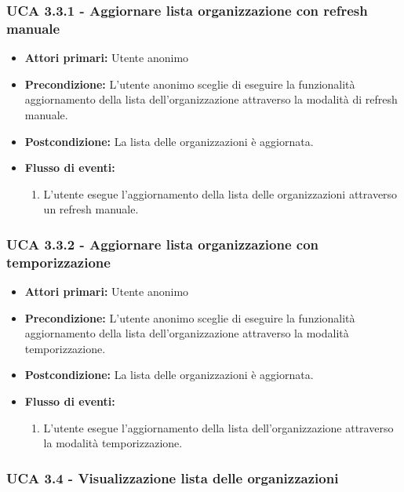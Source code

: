 \subsubsection{UCA 3.3.1 - Aggiornare lista organizzazione con refresh manuale}%
\begin{itemize}
	\item \textbf{Attori primari:} Utente anonimo
	\item \textbf{Precondizione:} L'utente anonimo sceglie di eseguire la funzionalità aggiornamento della lista dell'organizzazione attraverso la modalità di refresh manuale.
	\item \textbf{Postcondizione:} La lista delle organizzazioni è aggiornata.	
	\item \textbf{Flusso di eventi:}
	\begin{enumerate}
		\item L'utente esegue l'aggiornamento della lista delle organizzazioni attraverso un refresh manuale.
	\end{enumerate}
	
\end{itemize}

\subsubsection{UCA 3.3.2 - Aggiornare lista organizzazione con temporizzazione}%
\begin{itemize} 
	\item \textbf{Attori primari:} Utente anonimo
	\item \textbf{Precondizione:} L'utente anonimo sceglie di eseguire la funzionalità aggiornamento della lista dell'organizzazione attraverso la modalità temporizzazione.
	\item \textbf{Postcondizione:} La lista delle organizzazioni è aggiornata.
	\item \textbf{Flusso di eventi:}
	\begin{enumerate}
		\item L'utente esegue l'aggiornamento della lista dell'organizzazione attraverso la modalità temporizzazione.
	\end{enumerate}
\end{itemize}

\clearpage


\subsubsection{UCA 3.4 - Visualizzazione lista delle organizzazioni}%

